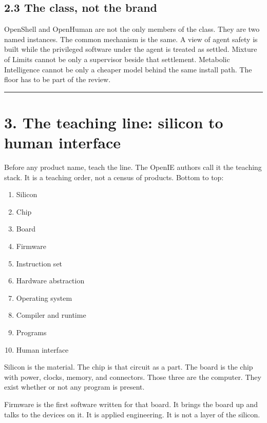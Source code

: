 \documentclass[10pt,letterpaper]{article}
\providecommand{\tightlist}{\setlength{\itemsep}{1pt}\setlength{\parskip}{0pt}}
\begin{document}
\subsection{2.3 The class, not the brand}\label{the-class-not-the-brand}

OpenShell and OpenHuman are not the only members of the class. They are
two named instances. The common mechanism is the same. A view of agent
safety is built while the privileged software under the agent is treated
as settled. Mixture of Limits cannot be only a supervisor beside that
settlement. Metabolic Intelligence cannot be only a cheaper model behind
the same install path. The floor has to be part of the review.

\begin{center}\rule{0.5\linewidth}{0.5pt}\end{center}

\section{3. The teaching line: silicon to human
interface}\label{the-teaching-line-silicon-to-human-interface}

Before any product name, teach the line. The OpenIE authors call it the
teaching stack. It is a teaching order, not a census of products. Bottom
to top:

\begin{enumerate}
\def\labelenumi{\arabic{enumi}.}
\tightlist
\item
  Silicon
\item
  Chip
\item
  Board
\item
  Firmware
\item
  Instruction set
\item
  Hardware abstraction
\item
  Operating system
\item
  Compiler and runtime
\item
  Programs
\item
  Human interface
\end{enumerate}

Silicon is the material. The chip is that circuit as a part. The board
is the chip with power, clocks, memory, and connectors. Those three are
the computer. They exist whether or not any program is present.

Firmware is the first software written for that board. It brings the
board up and talks to the devices on it. It is applied engineering. It
is not a layer of the silicon.
\end{document}
